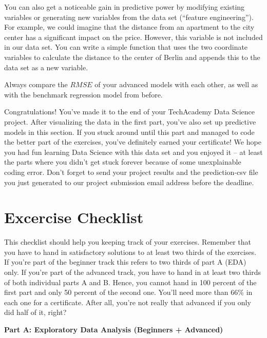 \documentclass[
  11pt,
]{article}
\begin{document}
You can also get a noticeable gain in predictive power by modifying existing variables or generating new variables from the data set (``feature engineering''). For example, we could imagine that the distance from an apartment to the city center has a significant impact on the price. However, this variable is not
included in our data set. You can write a simple function that uses the two coordinate variables to calculate the distance to the center of Berlin and appends this to the data set as a new variable.

Always compare the \(RMSE\) of your advanced models with each other, as well as with the benchmark regression model from before.

Congratulations! You've made it to the end of your TechAcademy Data Science project. After visualizing the data in the first part, you've also set up predictive models in this section. If you stuck around until this part and managed to code the better part of the exercises, you've definitely earned your certificate! We hope you had fun learning Data Science with this data set and you enjoyed it -- at least the parts where you didn't get stuck forever because of some unexplainable coding error. Don't forget to send your project results and the prediction-csv file you just generated to our project submission email address before the deadline.

\newpage

\hypertarget{excercise-checklist}{%
\section{Excercise Checklist}\label{excercise-checklist}}

This checklist should help you keeping track of your exercises. Remember that you have to hand in satisfactory solutions to at least two thirds of the exercises. If you're part of the beginner track this refers to two thirds of part A (EDA) only. If you're part of the advanced track, you have to hand in at least two thirds of both individual parts A and B. Hence, you cannot hand in 100 percent of the first part and only 50 percent of the second one. You'll need more than 66\% in each one for a certificate. After all, you're not really that advanced if you only did half of it, right?

\textbf{Part A: Exploratory Data Analysis (Beginners + Advanced)}
\end{document}
